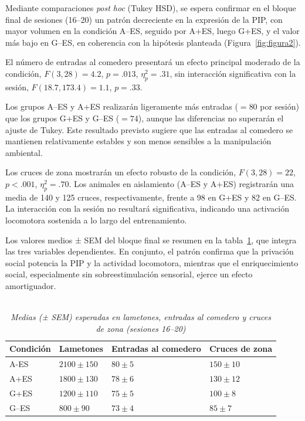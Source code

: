 \documentclass[12pt,a4paper]{article}
\begin{document}
\begin{multicols}{2}
Mediante comparaciones \textit{post hoc} (Tukey HSD), se espera confirmar en el bloque final de sesiones (16–20) un patrón decreciente en la expresión de la PIP, con mayor volumen en la condición A--ES, seguido por A+ES, luego G+ES, y el valor más bajo en G--ES, en coherencia con la hipótesis planteada (Figura~\ref{fig:figura2}).

El número de entradas al comedero presentará un efecto principal moderado de la condición, $F(3, 28) = 4.2$, $p = .013$, $\eta^2_p = .31$, sin interacción significativa con la sesión, $F(18.7, 173.4) = 1.1$, $p = .33$.

Los grupos A--ES y A+ES realizarán ligeramente más entradas ($= 80$ por sesión) que los grupos G+ES y G--ES ($= 74$), aunque las diferencias no superarán el ajuste de Tukey. Este resultado previsto sugiere que las entradas al comedero se mantienen relativamente estables y son menos sensibles a la manipulación ambiental.

Los cruces de zona mostrarán un efecto robusto de la condición, $F(3, 28) = 22$, $p < .001$, $\eta^2_p = .70$. Los animales en aislamiento (A--ES y A+ES) registrarán una media de 140 y 125 cruces, respectivamente, frente a 98 en G+ES y 82 en G--ES. La interacción con la sesión no resultará significativa, indicando una activación locomotora sostenida a lo largo del entrenamiento.

Los valores medios ± SEM del bloque final se resumen en la tabla~\ref{tab:tabla1}, que integra las tres variables dependientes. En conjunto, el patrón confirma que la privación social potencia la PIP y la actividad locomotora, mientras que el enriquecimiento social, especialmente sin sobreestimulación sensorial, ejerce un efecto amortiguador.


\begin{table}[t]
    \centering
    \begin{doublespace}
    \captionsetup{labelfont=bf, labelsep=none}
    \caption{\textit{\protect\\Medias (± SEM) esperadas en lametones, entradas al comedero y cruces de zona (sesiones 16--20)}}
    \label{tab:tabla1}
    \end{doublespace}
    \begin{tabularx}{\textwidth}{lXXX}
    \toprule
    \textbf{Condición} & \textbf{Lametones} & \textbf{Entradas al comedero} & \textbf{Cruces de zona} \\
    \midrule
    A-ES   & $2100 \pm 150$ & $80 \pm 5$ & $150 \pm 10$ \\
    A+ES  & $1800 \pm 130$ & $78 \pm 6$ & $130 \pm 12$ \\
    G+ES  & $1200 \pm 110$ & $75 \pm 5$ & $100 \pm 8$ \\
    G--ES & $800 \pm 90$   & $73 \pm 4$ & $85 \pm 7$ \\
    \bottomrule
    \end{tabularx}
    \vspace{1mm}
\end{table}



\end{multicols}
\end{document}
